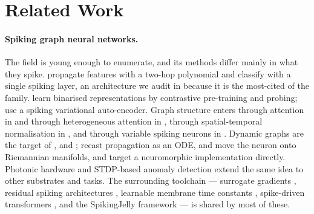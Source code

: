 \section{Related Work}
\label{sec:related}

\paragraph{Spiking graph neural networks.} The field is young enough to enumerate, and its methods
differ mainly in what they spike. \citet{zhu2022spiking} propagate features with a two-hop polynomial
and classify with a single spiking layer, an architecture we audit in  because it
is the most-cited of the family. \citet{li2023bit1} learn binarised representations by contrastive
pre-training and probing; \citet{yang2022svgae} use a spiking variational auto-encoder. Graph
structure enters through attention in \citet{sun2024spikegraphormer} and through heterogeneous
attention in \citet{cao2025hetgat}, through spatial-temporal normalisation in
\citet{xu2024unveiling}, and through variable spiking neurons in \citet{jain2024hybrid}. Dynamic
graphs are the target of \citet{chen2024signn}, \citet{yin2024dgsnn} and \citet{jahin2026chronospike};
\citet{fan2024continuous} recast propagation as an ODE, \citet{sun2024riemannian} and
\citet{zhang2025geometry} move the neuron onto Riemannian manifolds, and \citet{snyder2024loihi}
target a neuromorphic implementation directly. Photonic hardware \citep{yu2025photonic} and
STDP-based anomaly detection \citep{fofanah2026anomaly} extend the same idea to other substrates and
tasks. The surrounding toolchain --- surrogate gradients \citep{neftci2019surrogate}, residual
spiking architectures \citep{fang2021deep,zheng2021going}, learnable membrane time constants
\citep{fang2021incorporating}, spike-driven transformers \citep{yao2023spiking,yao2024spikingv2}, and
the SpikingJelly framework \citep{fang2023spikingjelly} --- is shared by most of these.

